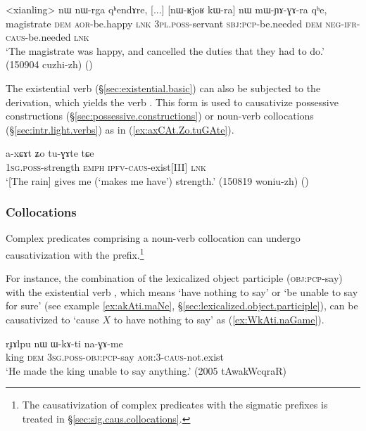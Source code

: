 \begin{exe}
\ex \label{ex:mWYAGAra}
\gll <xianling> nɯ nɯ-rga qʰendɤre, [...] [nɯ-ʁjoʁ kɯ-ra] nɯ mɯ-ɲɤ-ɣɤ-ra qʰe, \\
magistrate \textsc{dem} \textsc{aor}-be.happy \textsc{lnk} { } \textsc{3pl}.\textsc{poss}-servant \textsc{sbj}:\textsc{pcp}-be.needed \textsc{dem} \textsc{neg}-\textsc{ifr}-\textsc{caus}-be.needed \textsc{lnk} \\
\glt `The magistrate was happy, and cancelled the duties that they had to do.' (150904 cuzhi-zh)
()
\end{exe}
 
 The existential verb   (§\ref{sec:existential.basic}) can also be subjected to the  derivation, which yields the verb . This form is used to causativize possessive constructions (§\ref {sec:possessive.constructions}) or noun-verb collocations (§\ref{sec:intr.light.verbs}) as in (\ref{ex:axCAt.Zo.tuGAte}).
 
\begin{exe}
\ex \label{ex:axCAt.Zo.tuGAte}
\gll  a-xɕɤt ʑo tu-ɣɤte tɕe \\
\textsc{1sg}.\textsc{poss}-strength \textsc{emph} \textsc{ipfv}-\textsc{caus}-exist[III] \textsc{lnk} \\
\glt `[The rain] gives me (`makes me have') strength.' (150819 woniu-zh)
()
\end{exe}

\subsubsection{Collocations} \label{sec:velar.causative.collocation}
Complex predicates comprising a noun-verb collocation can undergo causativization with the  prefix.\footnote{The causativization of complex predicates with the sigmatic prefixes is treated in §\ref{sec:sig.caus.collocations}. }

For instance, the combination of the lexicalized object participle  (\textsc{obj}:\textsc{pcp}-say) with the existential verb , which means  `have nothing to say' or `be unable to say for sure' (see example \ref{ex:akAti.maNe}, §\ref{sec:lexicalized.object.participle}), can be causativized to  `cause $X$ to have nothing to say' as (\ref{ex:WkAti.naGame}).

\begin{exe}
\ex \label{ex:WkAti.naGame}
\gll rɟɤlpu nɯ ɯ-kɤ-ti na-ɣɤ-me \\
king \textsc{dem} \textsc{3sg}.\textsc{poss}-\textsc{obj}:\textsc{pcp}-say \textsc{aor}:3\flobv{}-\textsc{caus}-not.exist \\
\glt `He made the king unable to say anything.' (2005 tAwakWcqraR)
\end{exe}
 

